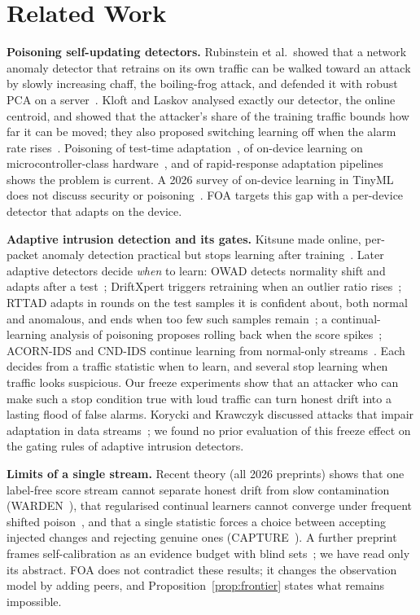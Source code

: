\section{Related Work}\label{sec:related}

\textbf{Poisoning self-updating detectors.} Rubinstein et al.\ showed that a network anomaly detector
that retrains on its own traffic can be walked toward an attack by slowly increasing chaff, the
boiling-frog attack, and defended it with robust PCA on a server~\cite{antidote}. Kloft and Laskov
analysed exactly our detector, the online centroid, and showed that the attacker's share of the training
traffic bounds how far it can be moved; they also proposed switching learning off when the alarm rate
rises~\cite{kloft}. Poisoning of test-time adaptation~\cite{su2025tta}, of on-device learning on
microcontroller-class hardware~\cite{sensors2024}, and of rapid-response adaptation
pipelines~\cite{rapidpoison} shows the problem is current. A 2026 survey of on-device learning in
TinyML does not discuss security or poisoning~\cite{tinymlsurvey}. FOA targets this
gap with a per-device detector that adapts on the device.

\textbf{Adaptive intrusion detection and its gates.} Kitsune made online, per-packet anomaly
detection practical but stops learning after training~\cite{kitsune}. Later adaptive detectors decide
\emph{when} to learn: OWAD detects normality shift and adapts after a test~\cite{owad}; DriftXpert
triggers retraining when an outlier ratio rises~\cite{driftxpert}; RTTAD adapts in rounds on the test
samples it is confident about, both normal and anomalous, and ends when too few such samples
remain~\cite{rttad}; a continual-learning analysis of poisoning proposes rolling back
when the score spikes~\cite{clpoison}; ACORN-IDS and CND-IDS continue learning from normal-only
streams~\cite{acorn,cndids}. Each decides from a traffic statistic when to learn, and several stop
learning when traffic looks suspicious. Our freeze experiments show that an attacker who can make such
a stop condition true with loud traffic can turn honest drift into a
lasting flood of false alarms. Korycki and Krawczyk discussed attacks that impair adaptation in data
streams~\cite{korycki}; we found no prior evaluation of this freeze effect on the gating rules of
adaptive intrusion detectors.

\textbf{Limits of a single stream.} Recent theory (all 2026 preprints) shows that one label-free score
stream cannot separate honest drift from slow contamination (WARDEN~\cite{warden}), that regularised
continual learners cannot converge under frequent shifted poison~\cite{clpoison}, and that a single
statistic forces a choice between accepting injected changes and rejecting genuine ones
(CAPTURE~\cite{capture}). A further preprint frames self-calibration as an evidence budget with blind
sets~\cite{selfcal}; we have read only its abstract. FOA does not contradict these results; it changes
the observation model by adding peers, and Proposition~\ref{prop:frontier} states what remains impossible.

